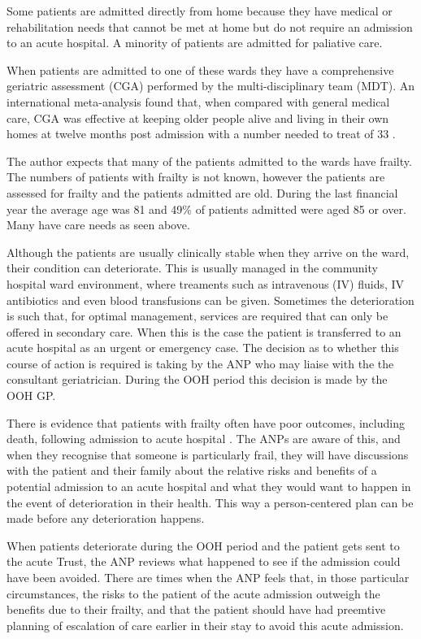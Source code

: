 \documentclass
[
	12pt,
	a4paper,
	oneside,
]{article}
\begin{document}
Some patients are admitted directly from home because they have medical or rehabilitation
needs that cannot be met at home but do not require an admission to an acute hospital.
A minority of patients are admitted for paliative care.

When patients are admitted to one of these wards they have a comprehensive geriatric 
assessment (CGA) \parencite{bgs:14} performed by the multi-disciplinary team (MDT).
An international meta-analysis found that, when compared with general medical care,
CGA was effective at keeping older people alive and living in their own homes at
twelve months post admission with a number needed to treat of 33 \parencite{ellis:11}.

The author expects that many of the patients admitted to the wards have frailty.
The numbers of patients with frailty is not known, however the patients are assessed 
for frailty and the patients admitted are old. During the last financial year the
average age was 81 and 49\% of patients admitted were aged 85 or over. Many have 
care needs as seen above.

Although the patients are usually clinically stable when they arrive on the ward,
their condition can deteriorate. This is usually managed in the community hospital
ward environment, where treaments such as intravenous (IV) fluids, IV antibiotics
and even blood transfusions can be given. Sometimes the deterioration is such that, 
for optimal management, services are required that can only be offered in secondary 
care. When this is the case the patient is transferred to an acute hospital as an
urgent or emergency case. The decision as to whether this course of action is required
is taking by the ANP who may liaise with the the consultant geriatrician. During
the OOH period this decision is made by the OOH GP.

There is evidence that patients with frailty often have poor outcomes, including death,
following admission to acute hospital \parencite{silver:12, wallis:15}. The ANPs
are aware of this, and when they recognise that someone is particularly frail, they
will have discussions with the patient and their family about the relative risks
and benefits of a potential admission to an acute hospital and what they would want to 
happen in the event of deterioration in their health. This way a person-centered 
plan can be made before any deterioration happens.

When patients deteriorate during the OOH period and the patient
gets sent to the acute Trust, the ANP reviews what happened to see if the admission
could have been avoided. There are times when the ANP feels that, in those particular
circumstances, the risks to the patient of the acute admission outweigh the benefits
due to their frailty, and that the patient should have had preemtive planning of 
escalation of care earlier in their stay to avoid this acute admission.
\end{document}
